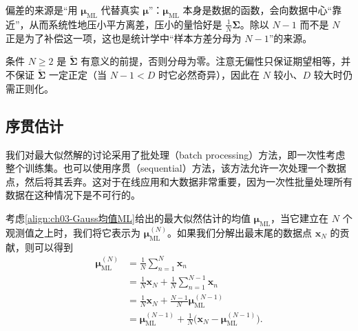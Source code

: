 \documentclass[../../main.tex]{subfiles}
\begin{document}
\begin{remark}
偏差的来源是“用 $\boldsymbol{\mu}_{\mathrm{ML}}$ 代替真实 $\boldsymbol{\mu}$”：$\boldsymbol{\mu}_{\mathrm{ML}}$ 本身是数据的函数，会向数据中心“靠近”，从而系统性地压小平方离差，压小的量恰好是 $\frac{1}{N}\boldsymbol{\Sigma}$。除以 $N-1$ 而不是 $N$ 正是为了补偿这一项，这也是统计学中“样本方差分母为 $N-1$”的来源。

条件 $N\geqslant2$ 是 $\tilde{\boldsymbol{\Sigma}}$ 有意义的前提，否则分母为零。注意无偏性只保证期望相等，并不保证 $\tilde{\boldsymbol{\Sigma}}$ 一定正定（当 $N-1<D$ 时它必然奇异），因此在 $N$ 较小、$D$ 较大时仍需正则化。
\end{remark}

\subsection{序贯估计}\label{subsection:ch03-序贯估计}

我们对最大似然解的讨论采用了批处理（batch processing）方法，即一次性考虑整个训练集。也可以使用序贯（sequential）方法，该方法允许一次处理一个数据点，然后将其丢弃。这对于在线应用和大数据非常重要，因为一次性批量处理所有数据在这种情况下是不可行的。

考虑\eqref{align:ch03-Gauss均值ML}给出的最大似然估计的均值 $\boldsymbol{\mu}_{\mathrm{ML}}$，当它建立在 $N$ 个观测值之上时，我们将它表示为 $\boldsymbol{\mu}_{\mathrm{ML}}^{(N)}$。如果我们分解出最末尾的数据点 $\boldsymbol{x}_N$ 的贡献，则可以得到
\begin{align}
\boldsymbol{\mu}_{\mathrm{ML}}^{(N)}&=\frac{1}{N}\sum_{n=1}^{N}\boldsymbol{x}_n\nonumber\\
&=\frac{1}{N}\boldsymbol{x}_N+\frac{1}{N}\sum_{n=1}^{N-1}\boldsymbol{x}_n\nonumber\\
&=\frac{1}{N}\boldsymbol{x}_N+\frac{N-1}{N}\boldsymbol{\mu}_{\mathrm{ML}}^{(N-1)}\nonumber\\
&=\boldsymbol{\mu}_{\mathrm{ML}}^{(N-1)}+\frac{1}{N}\bigl(\boldsymbol{x}_N-\boldsymbol{\mu}_{\mathrm{ML}}^{(N-1)}\bigr).
\label{align:ch03-序贯更新}
\end{align}
\end{document}
